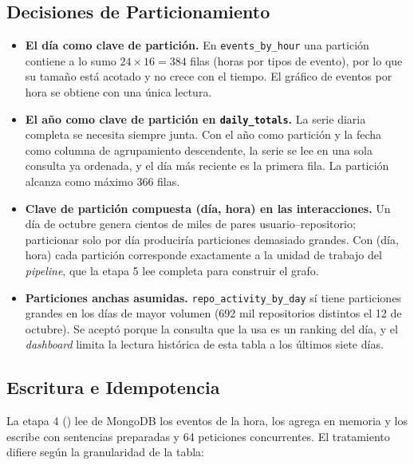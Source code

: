 \subsection{Decisiones de Particionamiento}

\begin{itemize}[leftmargin=*]
    \item \textbf{El día como clave de partición.} En \texttt{events\_by\_hour} una partición contiene a lo sumo $24 \times 16 = 384$ filas (horas por tipos de evento), por lo que su tamaño está acotado y no crece con el tiempo. El gráfico de eventos por hora se obtiene con una única lectura.
    \item \textbf{El año como clave de partición en \texttt{daily\_totals}.} La serie diaria completa se necesita siempre junta. Con el año como partición y la fecha como columna de agrupamiento descendente, la serie se lee en una sola consulta ya ordenada, y el día más reciente es la primera fila. La partición alcanza como máximo 366 filas.
    \item \textbf{Clave de partición compuesta (día, hora) en las interacciones.} Un día de octubre genera cientos de miles de pares usuario--repositorio; particionar solo por día produciría particiones demasiado grandes. Con (día, hora) cada partición corresponde exactamente a la unidad de trabajo del \textit{pipeline}, que la etapa 5 lee completa para construir el grafo.
    \item \textbf{Particiones anchas asumidas.} \texttt{repo\_activity\_by\_day} sí tiene particiones grandes en los días de mayor volumen (692 mil repositorios distintos el 12 de octubre). Se aceptó porque la consulta que la usa es un ranking del día, y el \textit{dashboard} limita la lectura histórica de esta tabla a los últimos siete días.
\end{itemize}

\subsection{Escritura e Idempotencia}

La etapa 4 () lee de MongoDB los eventos de la hora, los agrega en memoria y los escribe con sentencias preparadas y 64 peticiones concurrentes. El tratamiento difiere según la granularidad de la tabla:

